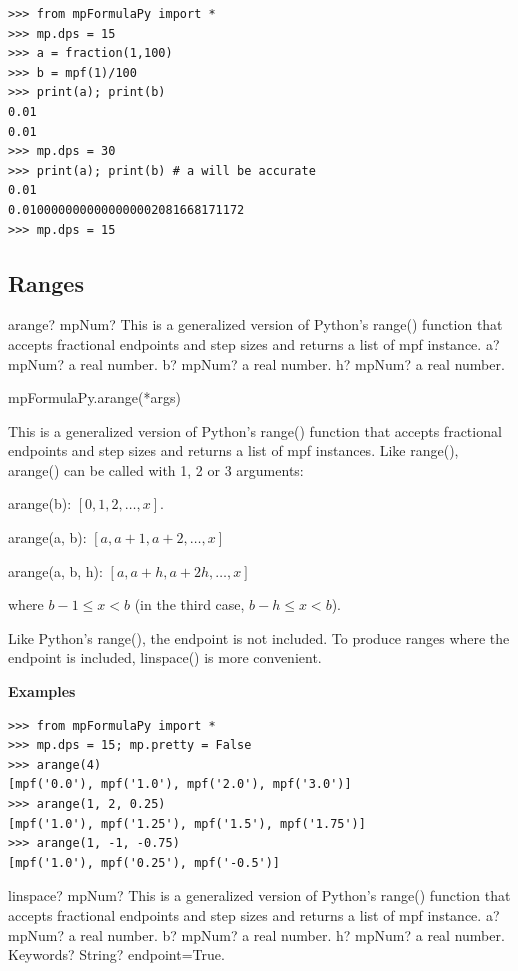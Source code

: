 \begin{lstlisting}
>>> from mpFormulaPy import *
>>> mp.dps = 15
>>> a = fraction(1,100)
>>> b = mpf(1)/100
>>> print(a); print(b)
0.01
0.01
>>> mp.dps = 30
>>> print(a); print(b) # a will be accurate
0.01
0.0100000000000000002081668171172
>>> mp.dps = 15
\end{lstlisting}



\subsection{Ranges}


\begin{mpFunctionsExtract}
	\mpFunctionThree
	{arange? mpNum?  This is a generalized version of Python's range() function that accepts fractional endpoints and step sizes and returns a list of mpf instance.}
	{a? mpNum? a real number.}
	{b? mpNum? a real number.}
	{h? mpNum? a real number.}	
\end{mpFunctionsExtract}


mpFormulaPy.arange(*args)

\vpara
This is a generalized version of Python's range() function that accepts fractional endpoints and step sizes and returns a list of mpf instances. Like range(), arange() can be called with 1, 2 or 3 arguments:

arange(b): $[0,1,2,\ldots,x]$.

arange(a, b): $[a, a+1,a+2,\ldots,x]$

arange(a, b, h): $[a,a+h,a+2h,\ldots,x]$

\vpara
where $b-1 \leq x < b$ (in the third case, $b-h \leq x < b$).

Like Python's range(), the endpoint is not included. To produce ranges where the endpoint is included, linspace() is more convenient.

\vpara
\textbf{Examples}

\begin{lstlisting}
>>> from mpFormulaPy import *
>>> mp.dps = 15; mp.pretty = False
>>> arange(4)
[mpf('0.0'), mpf('1.0'), mpf('2.0'), mpf('3.0')]
>>> arange(1, 2, 0.25)
[mpf('1.0'), mpf('1.25'), mpf('1.5'), mpf('1.75')]
>>> arange(1, -1, -0.75)
[mpf('1.0'), mpf('0.25'), mpf('-0.5')]
\end{lstlisting}


\vspace{0.6cm}


\begin{mpFunctionsExtract}
	\mpFunctionFour
	{linspace? mpNum?  This is a generalized version of Python's range() function that accepts fractional endpoints and step sizes and returns a list of mpf instance.}
	{a? mpNum? a real number.}
	{b? mpNum? a real number.}
	{h? mpNum? a real number.}	
	{Keywords? String? endpoint=True.}		
\end{mpFunctionsExtract}


